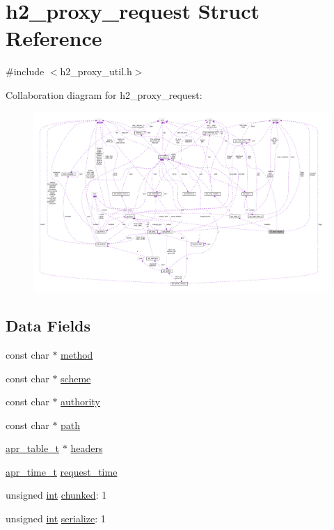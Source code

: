 \hypertarget{structh2__proxy__request}{}\section{h2\+\_\+proxy\+\_\+request Struct Reference}
\label{structh2__proxy__request}


{\ttfamily \#include $<$h2\+\_\+proxy\+\_\+util.\+h$>$}



Collaboration diagram for h2\+\_\+proxy\+\_\+request\+:
\nopagebreak
\begin{figure}[H]
\begin{center}
\leavevmode
\includegraphics[width=350pt]{structh2__proxy__request__coll__graph}
\end{center}
\end{figure}
\subsection*{Data Fields}
\begin{DoxyCompactItemize}
\item 
const char $\ast$ \hyperlink{structh2__proxy__request_add377aa05871d58a5c4d2a839c297db4}{method}
\item 
const char $\ast$ \hyperlink{structh2__proxy__request_a15c79eed4cfcaacd0540dcd306d2a2af}{scheme}
\item 
const char $\ast$ \hyperlink{structh2__proxy__request_a215085650d4e8e3ee2ca98ca87dc1e34}{authority}
\item 
const char $\ast$ \hyperlink{structh2__proxy__request_a7e29bb6643f5156b4a4b6b914a6d17df}{path}
\item 
\hyperlink{structapr__table__t}{apr\+\_\+table\+\_\+t} $\ast$ \hyperlink{structh2__proxy__request_a309c7758177877a650214cd498027c43}{headers}
\item 
\hyperlink{group__apr__time_gadb4bde16055748190eae190c55aa02bb}{apr\+\_\+time\+\_\+t} \hyperlink{structh2__proxy__request_a67a6f3d7961c7befb804df9a061637e9}{request\+\_\+time}
\item 
unsigned \hyperlink{pcre_8txt_a42dfa4ff673c82d8efe7144098fbc198}{int} \hyperlink{structh2__proxy__request_a8b5b138e841021954579ebfdb0b140b1}{chunked}\+: 1
\item 
unsigned \hyperlink{pcre_8txt_a42dfa4ff673c82d8efe7144098fbc198}{int} \hyperlink{structh2__proxy__request_aafb9028cabadceca1711bc2df16325e0}{serialize}\+: 1
\end{DoxyCompactItemize}



